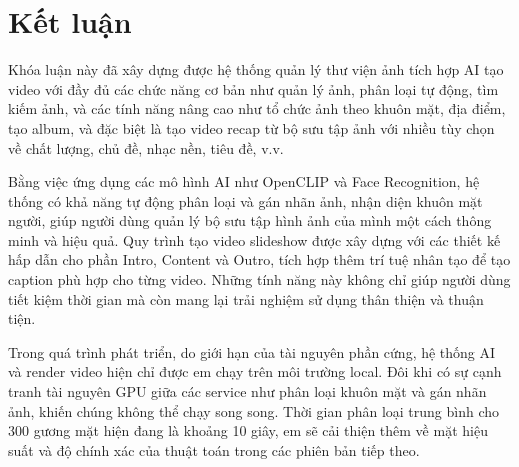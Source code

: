 \chapter*{Kết luận}

Khóa luận này đã xây dựng được hệ thống quản lý thư viện ảnh tích hợp AI tạo video với đầy đủ các chức năng cơ bản như quản lý ảnh, phân loại tự động, tìm kiếm ảnh, và các tính năng nâng cao như tổ chức ảnh theo khuôn mặt, địa điểm, tạo album, và đặc biệt là tạo video recap từ bộ sưu tập ảnh với nhiều tùy chọn về chất lượng, chủ đề, nhạc nền, tiêu đề, v.v.

Bằng việc ứng dụng các mô hình AI như OpenCLIP và Face Recognition, hệ thống có khả năng tự động phân loại và gán nhãn ảnh, nhận diện khuôn mặt người, giúp người dùng quản lý bộ sưu tập hình ảnh của mình một cách thông minh và hiệu quả. Quy trình tạo video slideshow được xây dựng với các thiết kế hấp dẫn cho phần Intro, Content và Outro, tích hợp thêm trí tuệ nhân tạo để tạo caption phù hợp cho từng video. Những tính năng này không chỉ giúp người dùng tiết kiệm thời gian mà còn mang lại trải nghiệm sử dụng thân thiện và thuận tiện.

Trong quá trình phát triển, do giới hạn của tài nguyên phần cứng, hệ thống AI và render video hiện chỉ được em chạy trên môi trường local. Đôi khi có sự cạnh tranh tài nguyên GPU giữa các service như phân loại khuôn mặt và gán nhãn ảnh, khiến chúng không thể chạy song song. Thời gian phân loại trung bình cho 300 gương mặt hiện đang là khoảng 10 giây, em sẽ cải thiện thêm về mặt hiệu suất và độ chính xác của thuật toán trong các phiên bản tiếp theo.